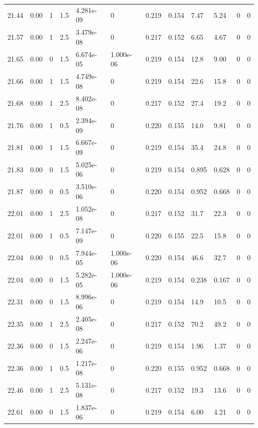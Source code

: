 \documentclass[preview]{standalone}
\begin{document}
{{{{{{{{{{\begin{tabular}{L{1.2cm}C{1.2cm} C{0.3cm}C{0.5cm} C{1.4cm}C{1.4cm} C{1.4cm}C{1.4cm} C{1.6cm}C{1.6cm} C{1.6cm}C{1.6cm}}
  21.44  &  0.00  & 1     & 1.5 &  4.281e-09  & 0  &  0.219&   0.154& 7.47 & 5.24   &  0 & 0  \\ 
  21.57  &  0.00  & 1     & 2.5 &  3.479e-08  & 0  &  0.217&   0.152& 6.65 & 4.67   &  0 & 0  \\ 
  21.65  &  0.00  & 0     & 1.5 &  6.674e-05  & 1.000e-06  &  0.219&   0.154& 12.8 & 9.00   &  0 & 0  \\ 
  21.66  &  0.00  & 1     & 1.5 &  4.749e-08  & 0  &  0.219&   0.154& 22.6 & 15.8   &  0 & 0  \\ 
  21.68  &  0.00  & 1     & 2.5 &  8.402e-08  & 0  &  0.217&   0.152& 27.4 & 19.2   &  0 & 0  \\ 
  21.76  &  0.00  & 1     & 0.5 &  2.394e-09  & 0  &  0.220&   0.155& 14.0 & 9.81   &  0 & 0  \\ 
  21.81  &  0.00  & 1     & 1.5 &  6.667e-09  & 0  &  0.219&   0.154& 35.4 & 24.8   &  0 & 0  \\ 
  21.83  &  0.00  & 0     & 1.5 &  5.025e-06  & 0  &  0.219&   0.154& 0.895 & 0.628   &  0 & 0  \\ 
  21.87  &  0.00  & 0     & 0.5 &  3.510e-06  & 0  &  0.220&   0.154& 0.952 & 0.668   &  0 & 0  \\ 
  22.01  &  0.00  & 1     & 2.5 &  1.052e-08  & 0  &  0.217&   0.152& 31.7 & 22.3   &  0 & 0  \\ 
  22.01  &  0.00  & 1     & 0.5 &  7.147e-09  & 0  &  0.220&   0.155& 22.5 & 15.8   &  0 & 0  \\ 
  22.04  &  0.00  & 0     & 0.5 &  7.944e-05  & 1.000e-06  &  0.220&   0.154& 46.6 & 32.7   &  0 & 0  \\ 
  22.04  &  0.00  & 0     & 1.5 &  5.282e-05  & 1.000e-06  &  0.219&   0.154& 0.238 & 0.167   &  0 & 0  \\ 
  22.31  &  0.00  & 0     & 1.5 &  8.996e-06  & 0  &  0.219&   0.154& 14.9 & 10.5   &  0 & 0  \\ 
  22.35  &  0.00  & 1     & 2.5 &  2.405e-08  & 0  &  0.217&   0.152& 70.2 & 49.2   &  0 & 0  \\ 
  22.36  &  0.00  & 0     & 1.5 &  2.247e-06  & 0  &  0.219&   0.154& 1.96 & 1.37   &  0 & 0  \\ 
  22.36  &  0.00  & 1     & 0.5 &  1.217e-08  & 0  &  0.220&   0.155& 0.952 & 0.668   &  0 & 0  \\ 
  22.46  &  0.00  & 1     & 2.5 &  5.131e-08  & 0  &  0.217&   0.152& 19.3 & 13.6   &  0 & 0  \\ 
  22.61  &  0.00  & 0     & 1.5 &  1.837e-06  & 0  &  0.219&   0.154& 6.00 & 4.21   &  0 & 0  \\ 

\end{tabular}}}}}}}}}}}
\end{document}
